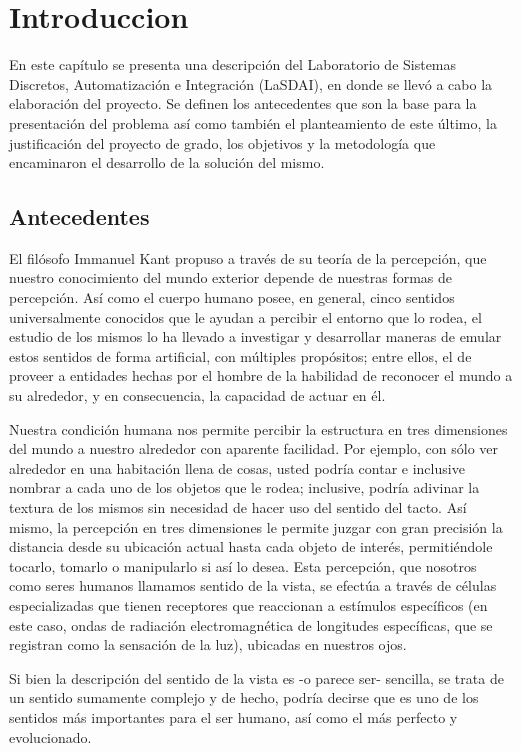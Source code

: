 \chapter{Introduccion}

En este capítulo se presenta una descripción del Laboratorio de Sistemas Discretos, Automatización e Integración (LaSDAI), en donde se llevó a cabo la elaboración del proyecto. Se definen los antecedentes que son la base para la presentación del problema así como también el planteamiento de este último, la justificación del proyecto de grado, los objetivos y la metodología que encaminaron el desarrollo de la solución del mismo.

\section{Antecedentes}

El filósofo Immanuel Kant propuso a través de su teoría de la percepción, que nuestro conocimiento del mundo exterior depende de nuestras formas de percepción. Así como el cuerpo humano posee, en general, cinco sentidos universalmente conocidos que le ayudan a percibir el entorno que lo rodea, el estudio de los mismos lo ha llevado a investigar y desarrollar maneras de emular estos sentidos de forma artificial, con múltiples propósitos; entre ellos, el de proveer a entidades hechas por el hombre de la habilidad de reconocer el mundo a su alrededor, y en consecuencia, la capacidad de actuar en él.

Nuestra condición humana nos permite percibir la estructura en tres dimensiones del mundo a nuestro alrededor con aparente facilidad. Por ejemplo, con sólo ver alrededor en una habitación llena de cosas, usted podría contar e inclusive nombrar a cada uno de los objetos que le rodea; inclusive, podría adivinar la textura de los mismos sin necesidad de hacer uso del sentido del tacto. Así mismo, la percepción en tres dimensiones le permite juzgar con gran precisión la distancia desde su ubicación actual hasta cada objeto de interés, permitiéndole tocarlo, tomarlo o manipularlo si así lo desea. Esta percepción, que nosotros como seres humanos llamamos sentido de la vista, se efectúa a través de células especializadas que tienen receptores que reaccionan a estímulos específicos (en este caso, ondas de radiación electromagnética de longitudes específicas, que se registran como la sensación de la luz), ubicadas en nuestros ojos.

Si bien la descripción del sentido de la vista es -o parece ser- sencilla, se trata de un sentido sumamente complejo y de hecho, podría decirse que es uno de los sentidos más importantes para el ser humano, así como el más perfecto y evolucionado.

